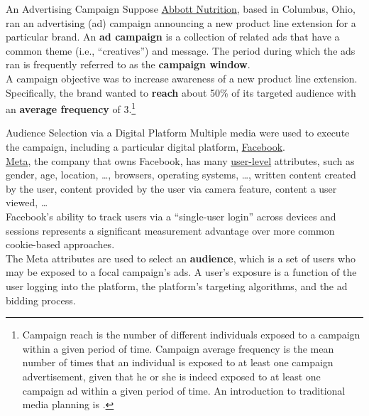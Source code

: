 \documentclass[pdf]{beamer}
\newcommand{\empr}[1]{{\color{franklinblue}\textbf{#1}}}
\theoremstyle{remark}
\theoremstyle{definition}
\begin{document}
\begin{frame}[t]{An Advertising Campaign}
Suppose \href{https://www.abbottnutrition.com/}{Abbott Nutrition}, based in Columbus, Ohio, ran an advertising (ad) campaign announcing a new product line extension for a particular brand.  An \empr{ad campaign} is a collection of related ads that have a common theme (i.e., ``creatives'') and message.  The period during which the ads ran is frequently referred to as the \empr{campaign window}. \\
\vspace{1.5ex}
A campaign objective was to increase awareness of a new product line extension.  Specifically, the brand wanted to \empr{reach} about 50\% of its targeted audience with an \empr{average frequency} of 3.\footnote{Campaign reach is the number of different individuals exposed to a campaign within a given period of time. Campaign average frequency is the mean number of times that an individual is exposed to at least one campaign advertisement, given that he or she is indeed exposed to at least one campaign ad within a given period of time. %
An introduction to traditional media planning is \cite{surmanek1996}.}  
\end{frame}

\begin{frame}[t]{Audience Selection via a Digital Platform}
Multiple media were used to execute the campaign, including a particular digital platform, \href{https://www.facebook.com/facebook/info/}{Facebook}.  \\
\vspace{1.5ex}
\href{https://www.facebook.com/Meta/}{Meta}, the company that owns Facebook, has many \underline{user-level} attributes, such as gender, age, location, \ldots, browsers, operating systems, \ldots, written content created by the user, content provided by the user via camera feature,  content a user viewed,  \ldots  \\
\vspace{1.5ex}
Facebook's ability to track users via a ``single-user login'' across devices and sessions represents a significant measurement advantage over more common cookie-based approaches. \\
\vspace{1.5ex}
The Meta attributes are used to select an \empr{audience}, which is a set of users who may be exposed to a focal campaign's ads.  A user's exposure is a function of the user logging into the platform, the platform's targeting algorithms, and the ad bidding process.   \\
\end{frame}
\end{document}
